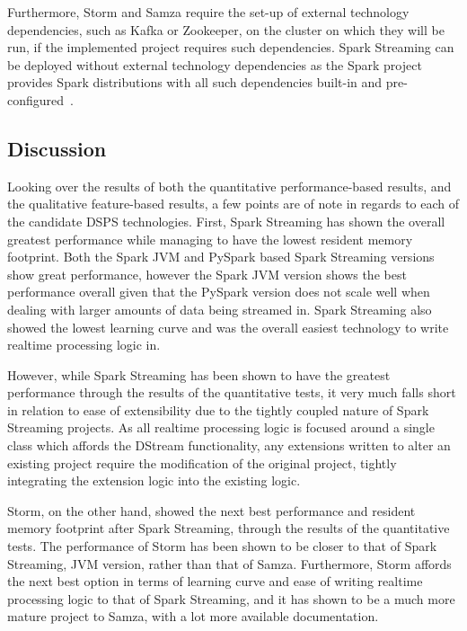Furthermore, Storm and Samza require the set-up of external technology dependencies, such as Kafka or Zookeeper, on the
cluster on which they will be run, if the implemented project requires such dependencies. Spark Streaming can be deployed
without external technology dependencies as the Spark project provides Spark distributions with all such dependencies built-in
and pre-configured~\cite{web:spark-downloads}.




\subsection{Discussion} %
\label{sub:eval_discussion}

Looking over the results of both the quantitative performance-based results, and the qualitative feature-based results,
a few points are of note in regards to each of the candidate DSPS technologies. First, Spark Streaming has shown the
overall greatest performance while managing to have the lowest resident memory footprint. Both the Spark JVM and PySpark
based Spark Streaming versions show great performance, however the Spark JVM version shows the best performance overall
given that the PySpark version does not scale well when dealing with larger amounts of data being streamed in.
Spark Streaming also showed the lowest learning curve and was the overall easiest technology to write realtime processing
logic in.

However, while Spark Streaming has been shown to have the greatest performance through the results of the quantitative
tests, it very much falls short in relation to ease of extensibility due to the tightly coupled nature of Spark Streaming
projects. As all realtime processing logic is focused around a single class which affords the DStream functionality,
any extensions written to alter an existing project require the modification of the original project, tightly integrating the
extension logic into the existing logic.

Storm, on the other hand, showed the next best performance and resident memory footprint after Spark Streaming, through
the results of the quantitative tests. The performance of Storm has been shown to be closer to that of Spark Streaming,
JVM version, rather than that of Samza. Furthermore, Storm affords the next best option in terms of learning curve and
ease of writing realtime processing logic to that of Spark Streaming, and it has shown to be a much more mature project
to Samza, with a lot more available documentation.

